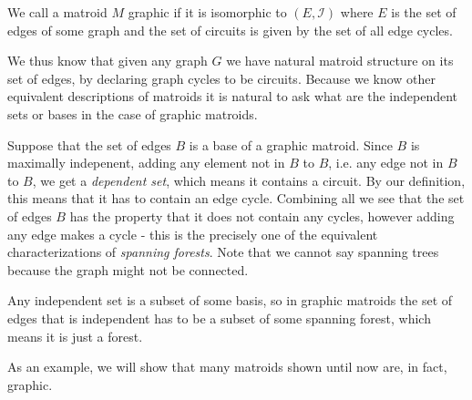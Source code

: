 

\begin{defn}
    We call a matroid $M$ graphic if it is isomorphic to $(E, \mathcal{I})$ where $E$ is the set of edges of some graph and the set of circuits is given by the set of all edge cycles.
\end{defn}



We thus know that given any graph $G$ we have natural matroid structure on its set of edges, by declaring graph cycles to be circuits. Because we know other equivalent descriptions of matroids it is natural to ask what are the independent sets or bases in the case of graphic matroids. 

Suppose that the set of edges $B$ is a base of a graphic matroid. 
Since $B$ is maximally indepenent, adding any element not in $B$ to $B$, i.e. any edge not in $B$ to $B$, we get a \textit{dependent set}, which means it contains a circuit. By our definition, this means that it has to contain an edge cycle. Combining all we see that the set of edges $B$ has the property that it does not contain any cycles, however adding any edge makes a cycle - this is the precisely one of the equivalent characterizations of \textit{spanning forests}. Note that we cannot say spanning trees because the graph might not be connected. 

Any independent set is a subset of some basis, so in graphic matroids the set of edges that is independent has to be a subset of some spanning forest, which means it is just a forest.

As an example, we will show that many matroids shown until now are, in fact, graphic. 

